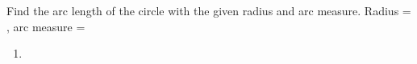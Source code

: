 Find the arc length of the circle with the given radius and arc measure.
\newline
Radius = , arc measure = \degree
\newline
\begin{enumerate}
    \item
\end{enumerate}

